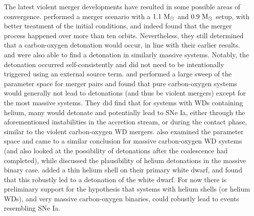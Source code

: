 \documentclass[12pt]{article}
\begin{document}
The latest violent merger developments have resulted in some possible areas of convergence.
\cite{pakmor:2012} performed a merger scenario
with a $1.1\ \mathrm{M}_\odot$ and $0.9\ \mathrm{M}_\odot$ setup, with better treatment
of the initial conditions, and indeed found that the merger process
happened over more than ten orbits. Nevertheless, they still determined
that a carbon-oxygen detonation would occur, in line with their
earlier results. \cite{moll:2014} and \cite{kashyap:2015} were also 
able to find a detonation in similarly massive systems. Notably,
the detonation occurred self-consistently and did not need to be  
intentionally triggered using an external source term.
\cite{dan:2012} and \cite{dan:2014} performed a large sweep 
of the parameter space for merger pairs and
found that pure carbon-oxygen systems would generally not lead to
detonations (and thus be violent mergers) except for the most massive
systems. They did find that for systems with WDs containing helium, many
would detonate and potentially lead to SNe Ia, either through the
aforementioned instabilities in the accretion stream, or during the
contact phase, similar to the violent carbon-oxygen WD
mergers. \cite{sato:2015} also examined the parameter space and
came to a similar conclusion for massive carbon-oxygen WD systems
(and also looked at the possibility of detonations after the
coalescence had completed), while \cite{tanikawa:2015} discussed
the plausibility of helium detonations in the massive binary case.
\cite{pakmor:2013} added a thin helium shell on their primary
white dwarf, and found that this robustly led to a detonation of the
white dwarf. For now there is preliminary support for the hypothesis
that systems with helium shells (or helium WDs), and very massive carbon-oxygen binaries,
could robustly lead to events resembling SNe Ia.
\end{document}

